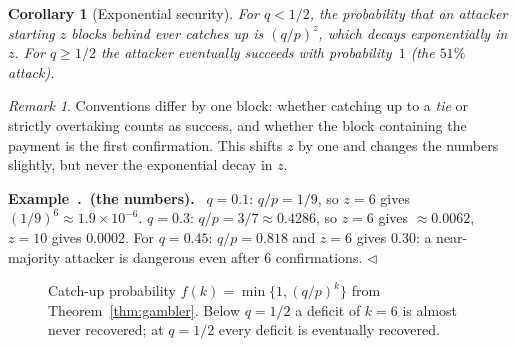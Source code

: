 \documentclass[11pt,a4paper]{article}
\newcounter{exn}[section]
\renewcommand{\theexn}{\thesection.\arabic{exn}}
\newenvironment{formal}{\par\smallskip}{\par\smallskip}
\newenvironment{exbox}[1][]{\par\medskip\refstepcounter{exn}\noindent\textbf{Example~\theexn\if\relax\detokenize{#1}\relax\else\ (#1)\fi.}\ \ignorespaces}{\hfill$\triangleleft$\par\medskip}
\theoremstyle{definition}
\theoremstyle{plain}
\newtheorem{corollary}[definition]{Corollary}
\theoremstyle{remark}
\newtheorem{remark}[definition]{Remark}
\begin{document}
\begin{formal}
\begin{corollary}[Exponential security]
For $q<1/2$, the probability that an attacker \emph{starting $z$ blocks behind} ever catches up is $(q/p)^z$, which decays exponentially in $z$. For $q\ge1/2$ the attacker eventually succeeds with probability~$1$ (the $51\%$ attack).
\end{corollary}
\begin{remark}
Conventions differ by one block: whether catching up to a \emph{tie} or strictly overtaking counts as success, and whether the block containing the payment is the first confirmation. This shifts $z$ by one and changes the numbers slightly, but never the exponential decay in $z$.
\end{remark}
\end{formal}

\begin{exbox}[the numbers]
$q=0.1$: $q/p=1/9$, so $z=6$ gives $(1/9)^6\approx1.9\times10^{-6}$. $q=0.3$: $q/p=3/7\approx0.4286$, so $z=6$ gives $\approx0.0062$, $z=10$ gives $0.0002$. For $q=0.45$: $q/p=0.818$ and $z=6$ gives $0.30$: a near-majority attacker is dangerous even after 6 confirmations.
\end{exbox}

\begin{figure}[htbp]
\centering
{}
\caption{Catch-up probability $f(k)=\min\{1,(q/p)^k\}$ from Theorem~\ref{thm:gambler}. Below $q=1/2$ a deficit of $k=6$ is almost never recovered; at $q=1/2$ every deficit is eventually recovered.}
\end{figure}
\end{document}
